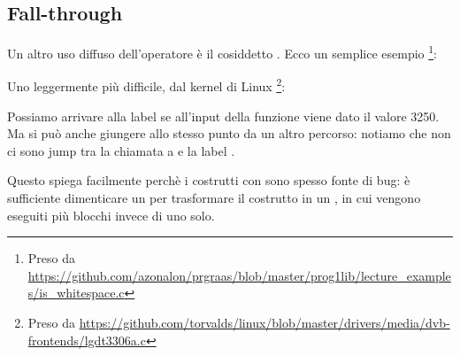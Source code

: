 \subsection{Fall-through}

Un altro uso diffuso dell'operatore  è il cosiddetto .
Ecco un semplice esempio \footnote{Preso da \url{https://github.com/azonalon/prgraas/blob/master/prog1lib/lecture_examples/is_whitespace.c}}:



Uno leggermente più difficile, dal kernel di Linux \footnote{Preso da \url{https://github.com/torvalds/linux/blob/master/drivers/media/dvb-frontends/lgdt3306a.c}}:





Possiamo arrivare alla label  se all'input della funzione viene dato il valore 3250.
Ma si può anche giungere allo stesso punto da un altro percorso:
notiamo che non ci sono jump tra la chiamata a \printf e la label .

Questo spiega facilmente perchè i costrutti con  sono spesso fonte di bug:
è sufficiente dimenticare un  per trasformare il costrutto  in un  , in cui vengono eseguiti
più blocchi invece di uno solo.
